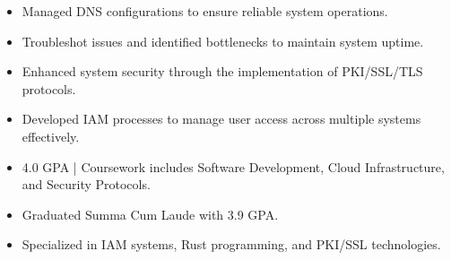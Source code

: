 \par\smallskip
\noindent
\begin{minipage}{20cm}
  \begin{minipage}{9.75cm}
    \begin{itemize}
      \item Managed DNS configurations to ensure reliable system operations.
      \item Troubleshot issues and identified bottlenecks to maintain system uptime.
    \end{itemize}
  \end{minipage}
  \hfill
  \begin{minipage}{9.75cm}
    \begin{itemize}
      \item Enhanced system security through the implementation of PKI/SSL/TLS protocols.
      \item Developed IAM processes to manage user access across multiple systems effectively.
    \end{itemize}
  \end{minipage}
\end{minipage}
\par\smallskip
\divider

\begin{itemize}
  \item 4.0 GPA | Coursework includes Software Development, Cloud Infrastructure, and Security Protocols.
\end{itemize}
\divider

\begin{itemize}
  \item Graduated Summa Cum Laude with 3.9 GPA.
  \item Specialized in IAM systems, Rust programming, and PKI/SSL technologies.
\end{itemize}

\noindent
\begin{minipage}{20cm}
\end{minipage}



